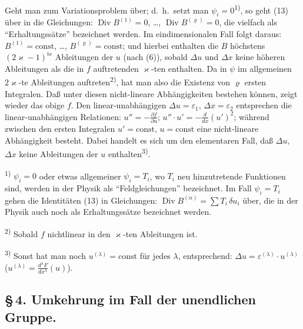 \documentclass[12pt,a4paper]{article}
\begin{document}
Geht man zum Variationsproblem \"uber; d.\ h.\ setzt man $\psi_{i}=0$\textsuperscript{1)}, so geht (13) \"uber in die Gleichungen: $\operatorname{Div}B^{(1)}=0$, \ldots, $\operatorname{Div}B^{(\varrho)}=0$, die vielfach als ``Erhaltungss\"atze'' bezeichnet werden. Im eindimensionalen Fall folgt daraus: $B^{(1)}=\mathrm{const}$, \ldots, $B^{(\varrho)}=\mathrm{const}$; und hierbei enthalten die $B$ h\"ochstens $(2\varkappa-1)^{\mathrm{te}}$ Ableitungen der $u$ (nach (6)), sobald $\Delta u$ und $\Delta x$ keine h\"oheren Ableitungen als die in $f$ auftretenden $\varkappa$-ten enthalten. Da in $\psi$ im allgemeinen $2\varkappa$-te Ableitungen auftreten\textsuperscript{2)}, hat man also die Existenz von $\varrho$ ersten Integralen. Da\ss{} unter diesen nicht-lineare Abh\"angigkeiten bestehen k\"onnen, zeigt wieder das obige $f$. Den linear-unabh\"angigen $\Delta u=\varepsilon_{1}$, $\Delta x=\varepsilon_{2}$ entsprechen die linear-unabh\"angigen Relationen: $u''=-\tfrac{\partial f}{\partial u}$; $u''\cdot u'=-\tfrac{d}{dx}(u')^{2}$; w\"ahrend zwischen den ersten Integralen $u'=\mathrm{const}$, $u=\mathrm{const}$ eine nicht-lineare Abh\"angigkeit besteht. Dabei handelt es sich um den elementaren Fall, da\ss{} $\Delta u$, $\Delta x$ keine Ableitungen der $u$ enthalten\textsuperscript{3)}.

\smallskip
\noindent\textsuperscript{1)} $\psi_{i}=0$ oder etwas allgemeiner $\psi_{i}=T_{i}$, wo $T_{i}$ neu hinzutretende Funktionen sind, werden in der Physik als ``Feldgleichungen'' bezeichnet. Im Fall $\psi_{i}=T_{i}$ gehen die Identit\"aten (13) in Gleichungen: $\operatorname{Div}B^{(\alpha)}=\sum T_{i}\,\delta u_{i}$ \"uber, die in der Physik auch noch als Erhaltungss\"atze bezeichnet werden.

\smallskip
\noindent\textsuperscript{2)} Sobald $f$ nichtlinear in den $\varkappa$-ten Ableitungen ist.

\smallskip
\noindent\textsuperscript{3)} Sonst hat man noch $u^{(\lambda)}=\mathrm{const}$ f\"ur jedes $\lambda$, entsprechend: $\Delta u=\varepsilon^{(\lambda)}\cdot u^{(\lambda)}$ ($u^{(\lambda)}=\frac{d^{\lambda}F}{dx^{\lambda}}(u)$).

\subsection*{\S\,4. Umkehrung im Fall der unendlichen Gruppe.}
\end{document}
